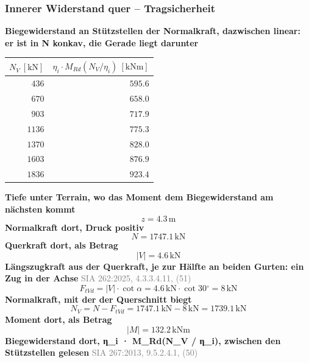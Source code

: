 \documentclass[11pt,a4paper]{article}
\newcommand{\normref}[1]{{\small\textcolor{gray}{#1}}}
\begin{document}
\subsubsection{Innerer Widerstand quer – Tragsicherheit}
\noindent\textbf{Biegewiderstand an Stützstellen der Normalkraft, dazwischen linear: er ist in N konkav, die Gerade liegt darunter}
\begin{longtable}{rr}
\hline
$N_V\ [\mathrm{kN}]$ & $\eta_i \cdot M_{Rd}(N_V / \eta_i)\ [\mathrm{kNm}]$ \\
\hline
\endhead
$436$ & $595.6$ \\
$670$ & $658.0$ \\
$903$ & $717.9$ \\
$1136$ & $775.3$ \\
$1370$ & $828.0$ \\
$1603$ & $876.9$ \\
$1836$ & $923.4$ \\
\hline
\end{longtable}
\noindent\textbf{Tiefe unter Terrain, wo das Moment dem Biegewiderstand am nächsten kommt}
\begin{equation*}
z = 4.3\,\mathrm{m}
\end{equation*}
\noindent\textbf{Normalkraft dort, Druck positiv}
\begin{equation*}
N = 1747.1\,\mathrm{kN}
\end{equation*}
\noindent\textbf{Querkraft dort, als Betrag}
\begin{equation*}
\left|V\right| = 4.6\,\mathrm{kN}
\end{equation*}
\noindent\textbf{Längszugkraft aus der Querkraft, je zur Hälfte an beiden Gurten: ein Zug in der Achse} \hfill \normref{SIA 262:2025, 4.3.3.4.11, (51)}
\begin{equation*}
F_{tVd} = \left|V\right| \cdot \cot \alpha = 4.6\,\mathrm{kN} \cdot \cot 30{}^{\circ} = 8\,\mathrm{kN}
\end{equation*}
\noindent\textbf{Normalkraft, mit der der Querschnitt biegt}
\begin{equation*}
N_V = N - F_{tVd} = 1747.1\,\mathrm{kN} - 8\,\mathrm{kN} = 1739.1\,\mathrm{kN}
\end{equation*}
\noindent\textbf{Moment dort, als Betrag}
\begin{equation*}
\left|M\right| = 132.2\,\mathrm{kNm}
\end{equation*}
\noindent\textbf{Biegewiderstand dort, η\_i · M\_Rd(N\_V / η\_i), zwischen den Stützstellen gelesen} \hfill \normref{SIA 267:2013, 9.5.2.4.1, (50)}
\end{document}
